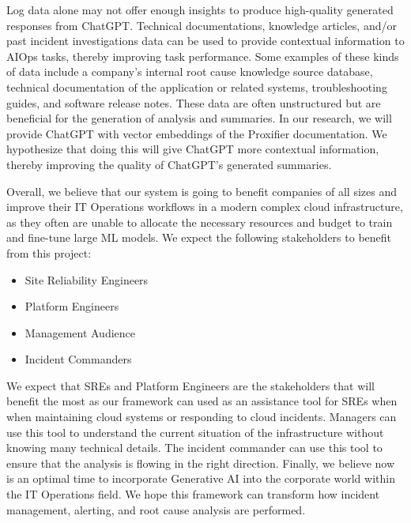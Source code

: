 \documentclass[conference]{IEEEtran}
\begin{document}
Log data alone may not offer enough insights to produce high-quality generated responses from ChatGPT. Technical documentations, knowledge articles, and/or past incident investigations data can be used to provide contextual information to AIOps tasks, thereby improving task performance. Some examples of these kinds of data include a company's internal root cause knowledge source database, technical documentation of the application or related systems, troubleshooting guides, and software release notes. These data are often unstructured but are beneficial for the generation of analysis and summaries. \cite{saha2022mining}  In our research, we will provide ChatGPT with vector embeddings of the Proxifier documentation. We hypothesize that doing this will give ChatGPT more contextual information, thereby improving the quality of ChatGPT's generated summaries.


Overall, we believe that our system is going to benefit companies of all sizes and improve their IT Operations workflows in a modern complex cloud infrastructure, as they often are unable to allocate the necessary resources and budget to train and fine-tune large ML models. We expect the following stakeholders to benefit from this project:
\begin{itemize}
    \item Site Reliability Engineers
    \item Platform Engineers 
    \item Management Audience 
    \item Incident Commanders 
\end{itemize}

We expect that SREs and Platform Engineers are the stakeholders that will benefit the most as our framework can used as an assistance tool for SREs when when maintaining cloud systems or responding to cloud incidents. Managers can use this tool to understand the current situation of the infrastructure without knowing many technical details. The incident commander can use this tool to ensure that the analysis is flowing in the right direction. Finally, we believe now is an optimal time to incorporate Generative AI into the corporate world within the IT Operations field. We hope this framework can transform how incident management, alerting, and root cause analysis are performed. 




\vspace{12pt}
\end{document}
